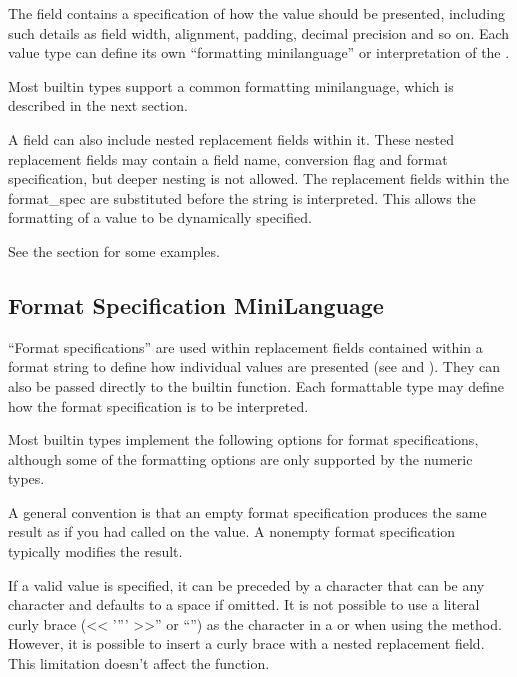 \documentclass[letterpaper,10pt,english]{sphinxmanual}
\begin{document}
The  field contains a specification of how the value should be
presented, including such details as field width, alignment, padding, decimal
precision and so on.  Each value type can define its own “formatting
mini\sphinxhyphen{}language” or interpretation of the .

Most built\sphinxhyphen{}in types support a common formatting mini\sphinxhyphen{}language, which is
described in the next section.

A  field can also include nested replacement fields within it.
These nested replacement fields may contain a field name, conversion flag
and format specification, but deeper nesting is
not allowed.  The replacement fields within the
format\_spec are substituted before the  string is interpreted.
This allows the formatting of a value to be dynamically specified.

See the {\hyperref[\detokenize{string:formatexamples}]{}} section for some examples.


\subsection{Format Specification Mini\sphinxhyphen{}Language}
\label{\detokenize{string:format-specification-mini-language}}\label{\detokenize{string:formatspec}}
“Format specifications” are used within replacement fields contained within a
format string to define how individual values are presented (see
{\hyperref[\detokenize{string:formatstrings}]{}} and ).
They can also be passed directly to the built\sphinxhyphen{}in
 function.  Each formattable type may define how the format
specification is to be interpreted.

Most built\sphinxhyphen{}in types implement the following options for format specifications,
although some of the formatting options are only supported by the numeric types.

A general convention is that an empty format specification produces
the same result as if you had called  on the value. A
non\sphinxhyphen{}empty format specification typically modifies the result.

If a valid  value is specified, it can be preceded by a 
character that can be any character and defaults to a space if omitted.
It is not possible to use a literal curly brace (<< '”' >>\sphinxcode{\sphinxupquote{\{}}” or “\sphinxcode{\sphinxupquote{\}}}”) as
the  character in a  or when using the 
method.  However, it is possible to insert a curly brace
with a nested replacement field.  This limitation doesn’t
affect the  function.
\end{document}
